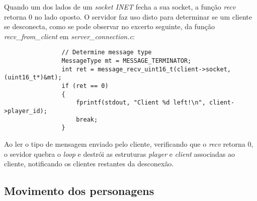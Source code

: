 \documentclass[a4paper]{report}
\begin{document}
            \par Quando um dos lados de um \textit{socket INET} fecha a sua socket, a função \textit{recv} retorna 0 no lado oposto. O servidor faz uso disto para determinar se um cliente se desconecta, como se pode observar no excerto seguinte, da função \textit{recv\_from\_client} em \textit{server\_connection.c}:
            \begin{lstlisting}
                // Determine message type
                MessageType mt = MESSAGE_TERMINATOR;
                int ret = message_recv_uint16_t(client->socket, (uint16_t*)&mt);
                if (ret == 0)
                {
                    fprintf(stdout, "Client %d left!\n", client->player_id);
                    break;
                }
            \end{lstlisting}
            \par Ao ler o tipo de mensagem enviado pelo cliente, verificando que o \textit{recv} retorna 0, o sevidor quebra o \textit{loop} e destrói as estruturas \textit{player} e \textit{client} associadas ao cliente, notificando os clientes restantes da desconexão.

        \subsection{Movimento dos personagens}
        
\end{document}
